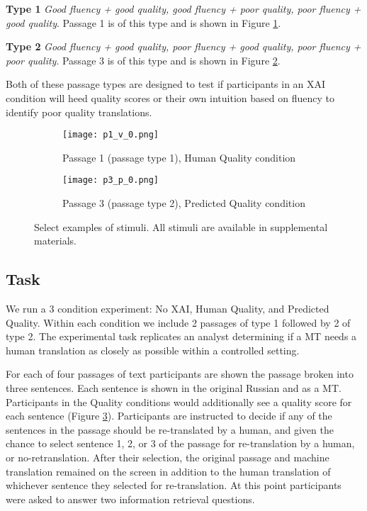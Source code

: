 \begin{compacthang}
    \item \textbf{Type 1} \textit{Good fluency + good quality, good fluency + poor quality, poor fluency + good quality}. Passage 1 is of this type and is shown in Figure \ref{fig:p1_human_quality}.    

    \item \textbf{Type 2} \textit{Good fluency + good quality, poor fluency + good quality, poor fluency + poor quality}. Passage 3 is of this type and is shown in Figure \ref{fig:p3_predicted_quality}.     
\end{compacthang}

Both of these passage types are designed to test if participants in an XAI condition will heed quality scores or their own intuition based on fluency to identify poor quality translations. 

\begin{figure}
    \centering
    
    \begin{subfigure}[t]{0.45\textwidth}
        \centering
        \texttt{[image: p1\_v\_0.png]} 
        \caption{Passage 1 (passage type 1), Human Quality condition} \label{fig:p1_human_quality}
    \end{subfigure}
    \hfill
     \begin{subfigure}[t]{0.45\textwidth}
        \centering
        \texttt{[image: p3\_p\_0.png]} 
        \caption{Passage 3 (passage type 2), Predicted Quality condition} \label{fig:p3_predicted_quality}
    \end{subfigure}
    
    \caption{Select examples of stimuli. All stimuli are available in supplemental materials.}
    \label{fig:exp_stim}
    
\end{figure}

\subsection{Task} 
We run a 3 condition experiment: No XAI, Human Quality, and Predicted Quality. Within each condition we include 2 passages of type 1 followed by 2 of type 2. The experimental task replicates an analyst determining if a MT needs a human translation as closely as possible within a controlled setting. 

For each of four passages of text participants are shown the passage broken into three sentences. Each sentence is shown in the original Russian and as a MT. Participants in the Quality conditions would additionally see a quality score for each sentence (Figure \ref{fig:exp_stim}). Participants are instructed to decide if any of the sentences in the passage should be re-translated by a human, and given the chance to select sentence 1, 2, or 3 of the passage for re-translation by a human, or no-retranslation. After their selection, the original passage and machine translation remained on the screen in addition to the human translation of whichever sentence they selected for re-translation. At this point participants were asked to answer two information retrieval questions. 


